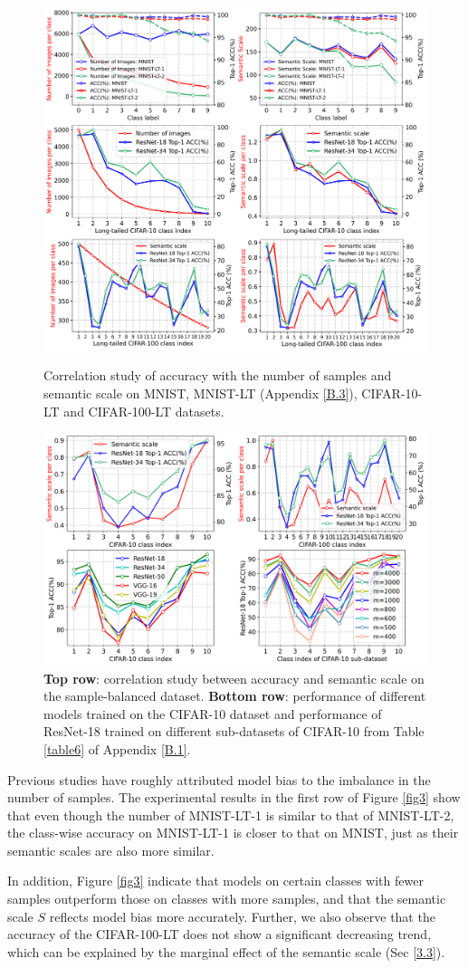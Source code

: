 \documentclass[10pt]{article} %
\begin{document}
\begin{figure} %
\begin{center}
\vskip -0.28in
\includegraphics[width=0.43\columnwidth]{3.1}
\vskip -0.1in
\caption{Correlation study of accuracy with the number of samples and semantic scale on MNIST, MNIST-LT (Appendix \ref{B.3}), CIFAR-10-LT and CIFAR-100-LT datasets.}
\label{fig3}

\vskip 0.1in
\includegraphics[width=0.43\columnwidth]{n3.2}
\vskip -0.1in
\caption{\textbf{Top row}: correlation study between accuracy and semantic scale on the sample-balanced dataset. \textbf{Bottom row}: performance of different models \cite{paper9} trained on the CIFAR-10 dataset and performance of ResNet-18 trained on different sub-datasets of CIFAR-10 from Table \ref{table6} of Appendix \ref{B.1}.}
\label{fig4}

\end{center}
\end{figure}

Previous studies have roughly attributed model bias to the imbalance in the number of samples. The experimental results in the first row of Figure \ref{fig3} show that even though the number of MNIST-LT-1 is similar to that of MNIST-LT-2, the class-wise accuracy on MNIST-LT-1 is closer to that on MNIST, just as their semantic scales are also more similar.

In addition, Figure \ref{fig3} indicate that models on certain classes with fewer samples outperform those on classes with more samples, and that the semantic scale $S$ reflects model bias more accurately. Further, we also observe that the accuracy of the CIFAR-100-LT does not show a significant decreasing trend, which can be explained by the marginal effect of the semantic scale (Sec \ref{3.3}).
\end{document}
